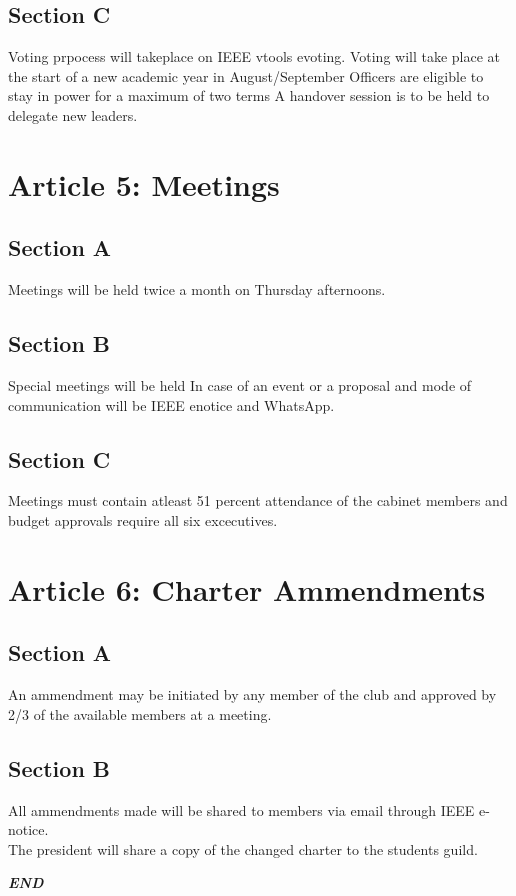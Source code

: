 \documentclass[a4paper,14pt]{article}
\begin{document}
    \subsection*{Section C}
    Voting prpocess will takeplace on IEEE vtools evoting.
    Voting will take place at the start of a new academic year in August/September
    Officers are eligible to stay in power for a maximum of two terms
    A handover session is to be held to delegate new leaders.

    \section*{Article 5: Meetings}
    \subsection*{Section A} Meetings will be held twice a month on Thursday afternoons.
    \subsection*{Section B} Special meetings will be held In case of an event or a proposal and mode of communication will be IEEE enotice and WhatsApp.
    \subsection*{Section C} Meetings must contain atleast 51 percent attendance of the cabinet members and budget approvals require all six excecutives.

    \section*{Article 6: Charter Ammendments}
    \subsection*{Section A}
    An ammendment may be initiated by any member of the club and approved by 2/3 of the available members at a meeting.
    \subsection*{Section B}
    All ammendments made will be shared to members via email through IEEE e-notice.\\ The president will share a copy of the changed charter to the students guild.

    \begin{center}
        {\LARGE\em\bf END}
    \end{center}
\end{document}
